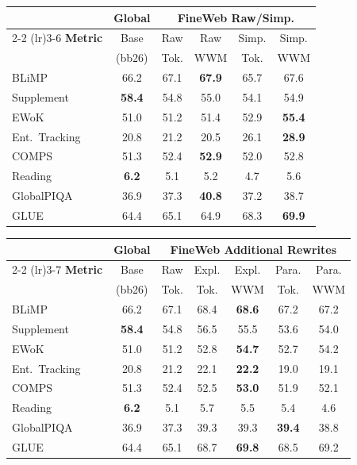 \documentclass[11pt]{article}
\begin{document}
\begin{center}
\centering
\scriptsize
\setlength{\tabcolsep}{2pt}
\begin{tabular}{lccccc}
\toprule
& \textbf{Global} & \multicolumn{4}{c}{\textbf{FineWeb Raw/Simp.}} \\
\cmidrule(lr){2-2} \cmidrule(lr){3-6}
\textbf{Metric} & Base & Raw & Raw & Simp. & Simp. \\
& (bb26) & Tok. & WWM & Tok. & WWM \\
\midrule
BLiMP & 66.2 & 67.1 & \textbf{67.9} & 65.7 & 67.6 \\
Supplement & \textbf{58.4} & 54.8 & 55.0 & 54.1 & 54.9 \\
EWoK & 51.0 & 51.2 & 51.4 & 52.9 & \textbf{55.4} \\
Ent.\ Tracking & 20.8 & 21.2 & 20.5 & 26.1 & \textbf{28.9} \\
COMPS & 51.3 & 52.4 & \textbf{52.9} & 52.0 & 52.8 \\
Reading & \textbf{6.2} & 5.1 & 5.2 & 4.7 & 5.6 \\
GlobalPIQA & 36.9 & 37.3 & \textbf{40.8} & 37.2 & 38.7 \\
GLUE & 64.4 & 65.1 & 64.9 & 68.3 & \textbf{69.9} \\
\bottomrule
\end{tabular}

\vspace{0.4em}
\begin{tabular}{lcccccc}
\toprule
& \textbf{Global} & \multicolumn{5}{c}{\textbf{FineWeb Additional Rewrites}} \\
\cmidrule(lr){2-2} \cmidrule(lr){3-7}
\textbf{Metric} & Base & Raw & Expl. & Expl. & Para. & Para. \\
& (bb26) & Tok. & Tok. & WWM & Tok. & WWM \\
\midrule
BLiMP & 66.2 & 67.1 & 68.4 & \textbf{68.6} & 67.2 & 67.2 \\
Supplement & \textbf{58.4} & 54.8 & 56.5 & 55.5 & 53.6 & 54.0 \\
EWoK & 51.0 & 51.2 & 52.8 & \textbf{54.7} & 52.7 & 54.2 \\
Ent.\ Tracking & 20.8 & 21.2 & 22.1 & \textbf{22.2} & 19.0 & 19.1 \\
COMPS & 51.3 & 52.4 & 52.5 & \textbf{53.0} & 51.9 & 52.1 \\
Reading & \textbf{6.2} & 5.1 & 5.7 & 5.5 & 5.4 & 4.6 \\
GlobalPIQA & 36.9 & 37.3 & 39.3 & 39.3 & \textbf{39.4} & 38.8 \\
GLUE & 64.4 & 65.1 & 68.7 & \textbf{69.8} & 68.5 & 69.2 \\
\bottomrule
\end{tabular}
\label{tab:full-results-fineweb}
\end{center}
\end{document}
